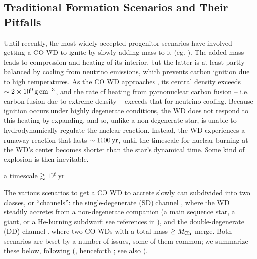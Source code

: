 \subsection{Traditional Formation Scenarios and Their Pitfalls}
\label{ssec:old_typeia}

Until recently, the most widely accepted progenitor scenarios have involved getting a CO WD to ignite by slowly adding mass to it (eg. \citealt{hilln00}).  The added mass leads to compression and heating of its interior, but the latter is at least partly balanced by cooling from neutrino emissions, which prevents carbon ignition due to high temperatures.  As the CO WD approaches \Mch, its central density exceeds $\sim2\times10^9\,\gcc$, and the rate of heating from pycnonuclear carbon fusion -- i.e. carbon fusion due to extreme density -- exceeds that for neutrino cooling.  Because ignition occurs under highly degenerate conditions, the WD does not respond to this heating by expanding, and so, unlike a non-degenerate star, is unable to hydrodynamically regulate the nuclear reaction.  Instead, the WD experiences a runaway reaction that lasts $\sim1000\,\mathrm{yr}$, until the timescale for nuclear burning at the WD's center becomes shorter than the star's dynamical time.  Some kind of explosion is then inevitable.

 a timescale $\gtrsim 10^6\,\mathrm{yr}$

The various scenarios to get a CO WD to accrete slowly can subdivided into two classes, or ``channels'': the single-degenerate (SD) channel \citep{wheli73}, where the WD steadily accretes from a non-degenerate companion (a main sequence star, a giant, or a He-burning subdwarf; see references in \citealt{maozns14}), and the double-degenerate (DD) channel \citep{ibent84, webb84}, where two CO WDs with a total mass $\gtrsim\Mch$ merge.  Both scenarios are beset by a number of issues, some of them common; we summarize these below, following \citeauthor{vkercj10} (\citeyear{vkercj10}, henceforth \citeal{vkercj10}; see also \citealt{vker13}).

